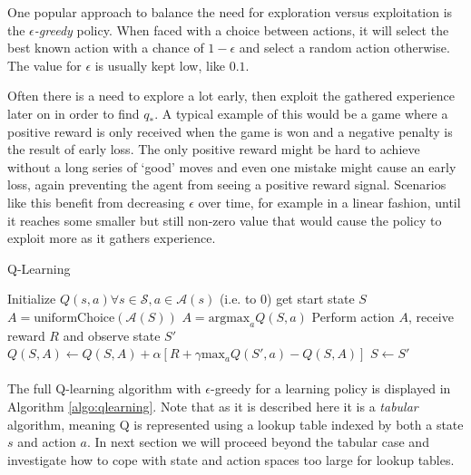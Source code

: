 One popular approach to balance the need
for exploration versus exploitation is
the \textit{$\epsilon$-greedy} policy.
When faced with a choice between actions,
it will select the best known action
with a chance of $1-\epsilon$
and select a random action otherwise.
The value for $\epsilon$ is usually kept low,
like $0.1$.

Often there is a need to explore a lot early,
then exploit the gathered experience later on
in order to find $q_*$.
A typical example of this would be a game
where a positive reward is only received when the game is won
and a negative penalty is the result of early loss.
The only positive reward might be hard to achieve
without a long series of `good' moves
and even one mistake might cause an early loss,
again preventing the agent from seeing a positive reward signal.
Scenarios like this benefit from decreasing $\epsilon$ over time,
for example in a linear fashion,
until it reaches some smaller but still non-zero value
that would cause the policy to exploit more
as it gathers experience.


\begin{algorithm}
  \caption{Q-Learning}
\label{algo:qlearning}
\begin{algorithmic}
  \State Initialize $Q(s,a) \forall s \in \mathcal{S}, a \in \mathcal{A}(s)$ (i.e. to 0)
    \State get start state $S$
        \State $A = \text{uniformChoice}(\mathcal{A}(S))$
      \Else
      \State $A = \text{argmax}_a Q(S, a)$
      \EndIf
      \State Perform action $A$, receive reward $R$ and observe state $S'$
      \State $Q(S, A) \gets Q(S, A) + \alpha \left[ R + \gamma \text{max}_a Q(S', a) - Q(S, A) \right]$
      \State $S \gets S'$
    \EndWhile
  \EndFor
\end{algorithmic}
\end{algorithm}

\paragraph{}
The full Q-learning algorithm
with $\epsilon$-greedy for a learning policy
is displayed in Algorithm \ref{algo:qlearning}.
Note that as it is described here it is a \textit{tabular} algorithm,
meaning Q is represented using a lookup table
indexed by both a state $s$ and action $a$.
In next section we will proceed beyond the tabular case
and investigate how to cope with
state and action spaces too large for lookup tables.

